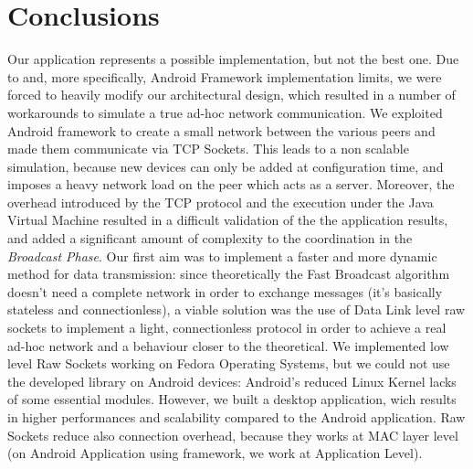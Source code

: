 \section{Conclusions}
	Our application represents a possible implementation, but not the best one. Due to \direct and, more specifically, Android \direct Framework implementation limits, we were forced to heavily modify our architectural design, which resulted in a number of workarounds to simulate a true ad-hoc network communication. We exploited Android \direct framework to create a small network between the various peers and made them communicate via TCP Sockets. This leads to a non scalable simulation, because new devices can only be added at configuration time, and imposes a heavy network load on the peer which acts as a server.
	Moreover, the overhead introduced by the TCP protocol and the execution under the Java Virtual Machine resulted in a difficult validation of the the application results, and added a significant amount of complexity to the coordination in the \textit{Broadcast Phase}.
	Our first aim was to implement a faster and more dynamic method for data transmission: since theoretically the Fast Broadcast algorithm doesn't need a complete network in order to exchange messages (it's basically stateless and connectionless), a viable solution was the use of Data Link level raw sockets to implement a light, connectionless protocol in order to achieve a real ad-hoc network and a behaviour closer to the theoretical. We implemented low level Raw Sockets working on Fedora Operating Systems, but we could not use the developed library on Android devices: Android's reduced Linux Kernel lacks of some essential modules. However, we built a desktop application, wich results in higher performances and scalability compared to the Android application. Raw Sockets reduce also connection overhead, because they works at MAC layer level (on Android Application using \direct framework, we work at Application Level).

